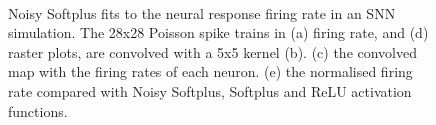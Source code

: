 \documentclass[runningheads,a4paper]{llncs}
\begin{document}
	\begin{figure}[bt!]
		\centering
		\\
		\caption{
			Noisy Softplus fits to the neural response firing rate in an SNN simulation.
			The 28x28 Poisson spike trains in (a) firing rate, and (d) raster plots, are convolved with a 5x5 kernel (b).
			(c) the convolved map with the firing rates of each neuron.
			(e) the normalised firing rate compared with Noisy Softplus, Softplus and ReLU activation functions.}
		\label{fig:cnn}
	\end{figure}
	
\end{document}
